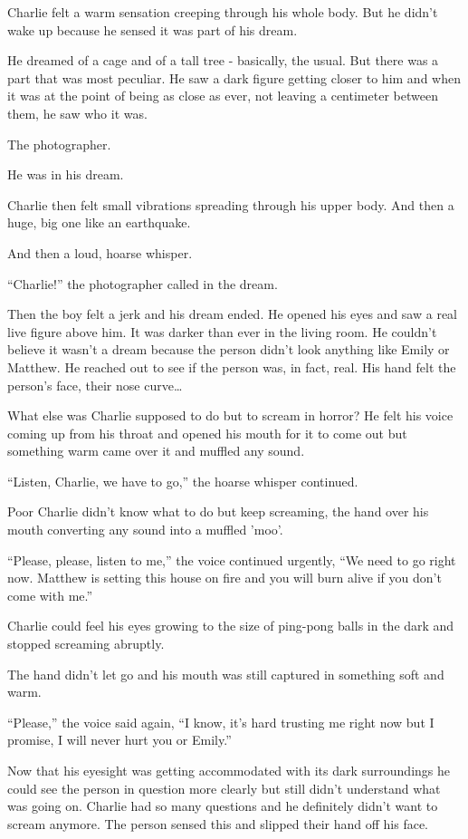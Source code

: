 Charlie felt a warm sensation creeping through his whole body. But he didn't wake up because he sensed it was part of his dream.

He dreamed of a cage and of a tall tree - basically, the usual. But there was a part that was most peculiar. He saw a dark figure getting closer to him and when it was at the point of being as close as ever, not leaving a centimeter between them, he saw who it was.

The photographer.

He was in his dream.

Charlie then felt small vibrations spreading through his upper body. And then a huge, big one like an earthquake.

And then a loud, hoarse whisper.

“Charlie!” the photographer called in the dream.

Then the boy felt a jerk and his dream ended. He opened his eyes and saw a real live figure above him. It was darker than ever in the living room. He couldn't believe it wasn't a dream because the person didn't look anything like Emily or Matthew. He reached out to see if the person was, in fact, real. His hand felt the person's face, their nose curve…

What else was Charlie supposed to do but to scream in horror? He felt his voice coming up from his throat and opened his mouth for it to come out but something warm came over it and muffled any sound.

“Listen, Charlie, we have to go,” the hoarse whisper continued.

Poor Charlie didn't know what to do but keep screaming, the hand over his mouth converting any sound into a muffled 'moo'.

“Please, please, listen to me,” the voice continued urgently, “We need to go right now. Matthew is setting this house on fire and you will burn alive if you don't come with me.”

Charlie could feel his eyes growing to the size of ping-pong balls in the dark and stopped screaming abruptly.

The hand didn't let go and his mouth was still captured in something soft and warm.

“Please,” the voice said again, “I know, it's hard trusting me right now but I promise, I will never hurt you or Emily.”

Now that his eyesight was getting accommodated with its dark surroundings he could see the person in question more clearly but still didn't understand what was going on. Charlie had so many questions and he definitely didn't want to scream anymore. The person sensed this and slipped their hand off his face.

